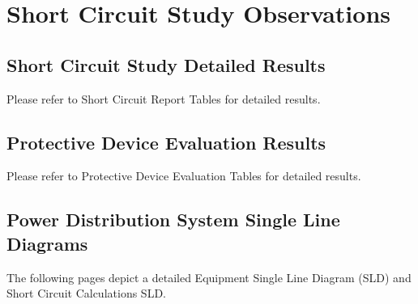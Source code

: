 \section{Short Circuit Study Observations}
\label{af:sccobservations}

\subsection{Short Circuit Study Detailed Results}
\label{af:observations:at}

Please refer to Short Circuit Report Tables for detailed results.

\pagebreak



\subsection{Protective Device Evaluation Results}
\label{af:observations:pde}

Please refer to Protective Device Evaluation Tables for detailed results.



\pagebreak

\subsection{Power Distribution System Single Line Diagrams}
\label{af:observations:sld}

The following pages depict a detailed Equipment Single Line Diagram (SLD) and Short Circuit Calculations SLD.


